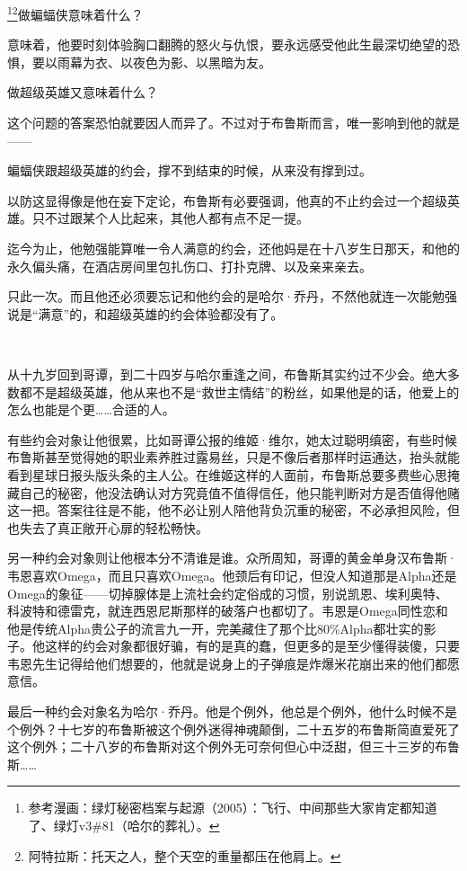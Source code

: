 \documentclass[../main]{subfiles}
\begin{document}
\footnote[1]{参考漫画：绿灯秘密档案与起源（2005）：飞行、中间那些大家肯定都知道了、绿灯v3\#81（哈尔的葬礼）。}\footnote[2]{阿特拉斯：托天之人，整个天空的重量都压在他肩上。}做蝙蝠侠意味着什么？

意味着，他要时刻体验胸口翻腾的怒火与仇恨，要永远感受他此生最深切绝望的恐惧，要以雨幕为衣、以夜色为影、以黑暗为友。

做超级英雄又意味着什么？

这个问题的答案恐怕就要因人而异了。不过对于布鲁斯而言，唯一影响到他的就是——

蝙蝠侠跟超级英雄的约会，撑不到结束的时候，从来没有撑到过。

以防这显得像是他在妄下定论，布鲁斯有必要强调，他真的不止约会过一个超级英雄。只不过跟某个人比起来，其他人都有点不足一提。

迄今为止，他勉强能算唯一令人满意的约会，还他妈是在十八岁生日那天，和他的永久偏头痛，在酒店房间里包扎伤口、打扑克牌、以及亲来亲去。

只此一次。而且他还必须要忘记和他约会的是哈尔·乔丹，不然他就连一次能勉强说是“满意”的，和超级英雄的约会体验都没有了。

~\

从十九岁回到哥谭，到二十四岁与哈尔重逢之间，布鲁斯其实约过不少会。绝大多数都不是超级英雄，他从来也不是“救世主情结”的粉丝，如果他是的话，他爱上的怎么也能是个更……合适的人。

有些约会对象让他很累，比如哥谭公报的维姬·维尔，她太过聪明缜密，有些时候布鲁斯甚至觉得她的职业素养胜过露易丝，只是不像后者那样时运通达，抬头就能看到星球日报头版头条的主人公。在维姬这样的人面前，布鲁斯总要多费些心思掩藏自己的秘密，他没法确认对方究竟值不值得信任，他只能判断对方是否值得他赌这一把。答案往往是不能，他不必让别人陪他背负沉重的秘密，不必承担风险，但也失去了真正敞开心扉的轻松畅快。

另一种约会对象则让他根本分不清谁是谁。众所周知，哥谭的黄金单身汉布鲁斯·韦恩喜欢Omega，而且只喜欢Omega。他颈后有印记，但没人知道那是Alpha还是Omega的象征——切掉腺体是上流社会约定俗成的习惯，别说凯恩、埃利奥特、科波特和德雷克，就连西恩尼斯那样的破落户也都切了。韦恩是Omega同性恋和他是传统Alpha贵公子的流言九一开，完美藏住了那个比80\%Alpha都壮实的影子。他这样的约会对象都很好骗，有的是真的蠢，但更多的是至少懂得装傻，只要韦恩先生记得给他们想要的，他就是说身上的子弹痕是炸爆米花崩出来的他们都愿意信。

最后一种约会对象名为哈尔·乔丹。他是个例外，他总是个例外，他什么时候不是个例外？十七岁的布鲁斯被这个例外迷得神魂颠倒，二十五岁的布鲁斯简直爱死了这个例外；二十八岁的布鲁斯对这个例外无可奈何但心中泛甜，但三十三岁的布鲁斯……
\end{document}
